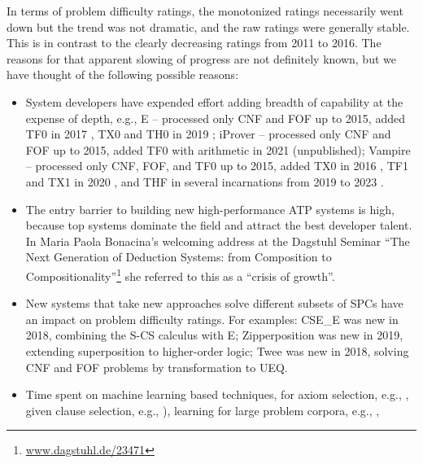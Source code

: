 \documentclass[runningheads]{llncs}
\begin{document}
In terms of problem difficulty ratings, the monotonized ratings necessarily went down but the 
trend was not dramatic, and the raw ratings were generally stable.
This is in contrast to the clearly decreasing ratings from 2011 to 2016.
The reasons for that apparent slowing of progress are not definitely known, but we have thought of 
the following possible reasons:
\begin{itemize}
\item System developers have expended effort adding breadth of capability at the expense of 
      depth, e.g., 
      E -- processed only CNF and FOF up to 2015, added TF0 in 2017 \cite{SCV19}, TX0 and TH0 
           in 2019 \cite{VB+19};
      iProver -- processed only CNF and FOF up to 2015, added TF0 with arithmetic in 2021 
           (unpublished);
      Vampire -- processed only CNF, FOF, and TF0 up to 2015, added TX0 in 2016 \cite{KK+16}, 
           TF1 and TX1 in 2020 \cite{BR20-IJCAR}, and THF in several incarnations from 2019 to 
           2023 \cite{BR19,Bha20-Thesis,BRS23}.
\item The entry barrier to building new high-performance ATP systems is high, because top systems
      dominate the field and attract the best developer talent.
      In Maria Paola Bonacina's welcoming address at the Dagstuhl Seminar ``The Next Generation 
      of Deduction Systems: from Composition to Compositionality''\footnote{%
      \href{https://www.dagstuhl.de/23471}{www.dagstuhl.de/23471}} she referred to this as a
     ``crisis of growth''.
\item New systems that take new approaches solve different subsets of SPCs have an impact on 
      problem difficulty ratings.
      For examples:
      CSE\_E \cite{XL+18} was new in 2018, combining the S-CS calculus with E;
      Zipperposition \cite{BB+21} was new in 2019, extending superposition to higher-order logic;
      Twee \cite{Sma21} was new in 2018, solving CNF and FOF problems by transformation to UEQ.
\item Time spent on machine learning based techniques, for axiom selection, e.g., 
      \cite{Urb06,KB14}, given clause selection, e.g., \cite{JU17-CICM,CA+21,AA+22-ML,MS23}), 
      learning for large problem corpora, e.g., \cite{KM+14,JU19,BL+19-ICML}, 

\end{itemize}
\end{document}
